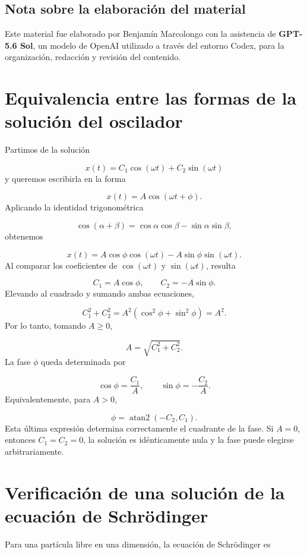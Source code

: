 \documentclass[12pt,a4paper]{article}
\begin{document}
	\subsection*{Nota sobre la elaboración del material}
	
	Este material fue elaborado por Benjamín Marcolongo con la asistencia de \textbf{GPT-5.6 Sol}, un modelo de OpenAI utilizado a través del entorno Codex, para la organización, redacción y revisión del contenido.
	
	\clearpage
	\appendix
	
	\section{Equivalencia entre las formas de la solución del oscilador}
	
	Partimos de la solución
	
	\[
	x(t)=C_1\cos(\omega t)+C_2\sin(\omega t)
	\]
	y queremos escribirla en la forma
	
	\[
	x(t)=A\cos(\omega t+\phi).
	\]
	Aplicando la identidad trigonométrica
	
	\[
	\cos(\alpha+\beta)
	=
	\cos\alpha\cos\beta
	-
	\sin\alpha\sin\beta,
	\]
	obtenemos
	
	\[
	x(t)
	=
	A\cos\phi\cos(\omega t)
	-
	A\sin\phi\sin(\omega t).
	\]
	Al comparar los coeficientes de \(\cos(\omega t)\) y \(\sin(\omega t)\), resulta
	
	\[
	C_1=A\cos\phi,
	\qquad
	C_2=-A\sin\phi.
	\]
	Elevando al cuadrado y sumando ambas ecuaciones,
	
	\[
	C_1^2+C_2^2
	=
	A^2\left(\cos^2\phi+\sin^2\phi\right)
	=
	A^2.
	\]
	Por lo tanto, tomando \(A\geq 0\),
	
	\[
	A=\sqrt{C_1^2+C_2^2}.
	\]
	La fase \(\phi\) queda determinada por
	
	\[
	\cos\phi=\frac{C_1}{A},
	\qquad
	\sin\phi=-\frac{C_2}{A}.
	\]
	Equivalentemente, para \(A>0\),
	
	\[
	\phi=\operatorname{atan2}(-C_2,C_1).
	\]
	Esta última expresión determina correctamente el cuadrante de la fase. Si \(A=0\), entonces \(C_1=C_2=0\), la solución es idénticamente nula y la fase puede elegirse arbitrariamente.
	
	\clearpage
	\section{Verificación de una solución de la ecuación de Schrödinger}
	
	Para una partícula libre en una dimensión, la ecuación de Schrödinger es
	
\end{document}
